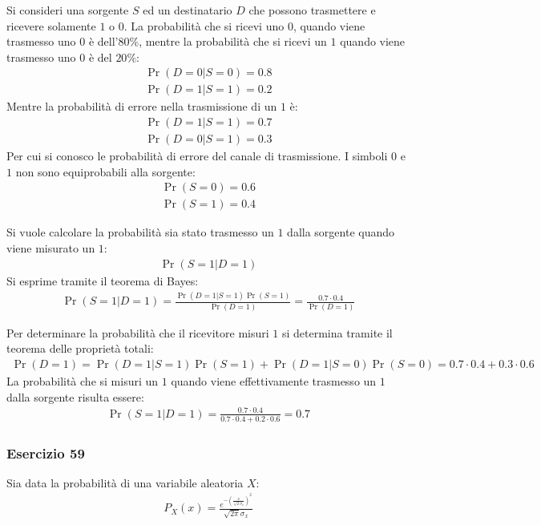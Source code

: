 \documentclass{article}
\begin{document}
Si consideri una sorgente $S$ ed un destinatario $D$ che possono trasmettere e ricevere solamente $1$ o $0$. La probabilità che si ricevi uno $0$, 
quando viene trasmesso uno $0$ è dell'$80\%$, mentre la probabilità che si ricevi un $1$ quando viene trasmesso uno $0$ è del $20\%$:
\begin{gather*}
    \Pr(D=0|S=0)=0.8\\
    \Pr(D=1|S=1)=0.2
\end{gather*}
Mentre la probabilità di errore nella trasmissione di un $1$ è:
\begin{gather*}
    \Pr(D=1|S=1)=0.7\\
    \Pr(D=0|S=1)=0.3
\end{gather*}
Per cui si conosco le probabilità di errore del canale di trasmissione.
I simboli $0$ e $1$ non sono equiprobabili alla sorgente:
\begin{gather*}
    \Pr(S=0)=0.6\\
    \Pr(S=1)=0.4
\end{gather*}

Si vuole calcolare la probabilità sia stato trasmesso un $1$ dalla sorgente quando viene misurato un $1$:
\begin{gather*}
    \Pr(S=1|D=1)
\end{gather*}
Si esprime tramite il teorema di Bayes:
\begin{gather*}
    \Pr(S=1|D=1)=\displaystyle\frac{\Pr(D=1|S=1)\Pr(S=1)}{\Pr(D=1)}=\frac{0.7\cdot0.4}{\Pr(D=1)}
\end{gather*}

Per determinare la probabilità che il ricevitore misuri $1$ si determina tramite il teorema delle proprietà totali:
\begin{gather*}
    \Pr(D=1)=\Pr(D=1|S=1)\Pr(S=1)+\Pr(D=1|S=0)\Pr(S=0)=0.7\cdot0.4+0.3\cdot0.6
\end{gather*}
La probabilità che si misuri un $1$ quando viene effettivamente trasmesso un $1$ dalla sorgente risulta essere:
\begin{gather}
    \Pr(S=1|D=1)=\displaystyle\frac{0.7\cdot0.4}{0.7\cdot0.4+0.2\cdot0.6}=0.7
\end{gather}

\subsubsection*{Esercizio 59}

Sia data la probabilità di una variabile aleatoria $X$:
\begin{gather*}
    P_X(x)=\displaystyle\frac{e^{-\left(\frac{x}{\sqrt{2}{\sigma_x}}\right)^2}}{\sqrt{2\pi}\sigma_x}
\end{gather*}
\end{document}

